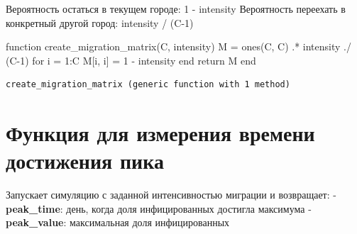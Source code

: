 \documentclass[
  12pt,
  a4paper,
  DIV=11,
  numbers=noendperiod]{scrreprt}
\newenvironment{Shaded}{\begin{snugshade}}{\end{snugshade}}
\newcommand{\ControlFlowTok}[1]{\textcolor[rgb]{0.00,0.23,0.31}{#1}}
\newcommand{\FloatTok}[1]{\textcolor[rgb]{0.68,0.00,0.00}{#1}}
\newcommand{\FunctionTok}[1]{\textcolor[rgb]{0.28,0.35,0.67}{#1}}
\newcommand{\KeywordTok}[1]{\textcolor[rgb]{0.00,0.23,0.31}{#1}}
\newcommand{\NormalTok}[1]{\textcolor[rgb]{0.00,0.23,0.31}{#1}}
\newcommand{\OperatorTok}[1]{\textcolor[rgb]{0.37,0.37,0.37}{#1}}
\begin{document}
Вероятность остаться в текущем городе: 1 - intensity Вероятность
переехать в конкретный другой город: intensity / (C-1)

\begin{Shaded}
\begin{Highlighting}[]
\KeywordTok{function} \FunctionTok{create\_migration\_matrix}\NormalTok{(C, intensity)}
\NormalTok{    M }\OperatorTok{=} \FunctionTok{ones}\NormalTok{(C, C) }\OperatorTok{.*}\NormalTok{ intensity }\OperatorTok{./}\NormalTok{ (C}\OperatorTok{{-}}\FloatTok{1}\NormalTok{)}
    \ControlFlowTok{for}\NormalTok{ i }\OperatorTok{=} \FloatTok{1}\OperatorTok{:}\NormalTok{C}
\NormalTok{        M[i, i] }\OperatorTok{=} \FloatTok{1} \OperatorTok{{-}}\NormalTok{ intensity}
    \ControlFlowTok{end}
    \ControlFlowTok{return}\NormalTok{ M}
\KeywordTok{end}
\end{Highlighting}
\end{Shaded}

\begin{verbatim}
create_migration_matrix (generic function with 1 method)
\end{verbatim}

\section{Функция для измерения времени достижения
пика}\label{ux444ux443ux43dux43aux446ux438ux44f-ux434ux43bux44f-ux438ux437ux43cux435ux440ux435ux43dux438ux44f-ux432ux440ux435ux43cux435ux43dux438-ux434ux43eux441ux442ux438ux436ux435ux43dux438ux44f-ux43fux438ux43aux430}

Запускает симуляцию с заданной интенсивностью миграции и возвращает: -
\textbf{peak\_time}: день, когда доля инфицированных достигла максимума
- \textbf{peak\_value}: максимальная доля инфицированных
\end{document}
